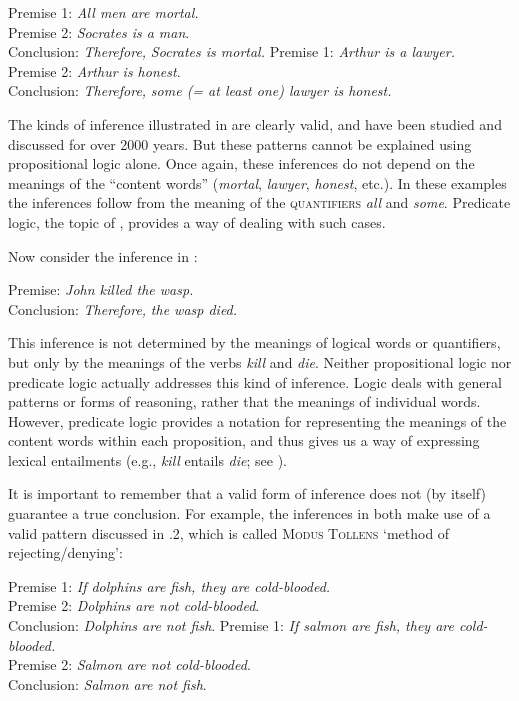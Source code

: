 \ea \label{ex:4.2}
\ea  Premise 1: \textit{All men are mortal.}\\
Premise 2: \textit{Socrates is a man}.\\
\FelixHRule
Conclusion: \textit{Therefore,} \textit{Socrates is mortal.}
\ex Premise 1: \textit{Arthur is a lawyer.}\\
Premise 2: \textit{Arthur is honest}.\\
\FelixHRule
Conclusion: \textit{Therefore,} \textit{some (= at least one) lawyer is honest.}
                       \z
\z


The kinds of inference illustrated in  are clearly valid, and have been studied and discussed for over 2000 years. But these patterns cannot be explained using propositional logic alone. Once again, these inferences do not depend on the meanings of the “content words” (\textit{mortal}, \textit{lawyer}, \textit{honest}, etc.). In these examples the inferences follow from the meaning of the \textsc{quantifiers} \textit{all} and \textit{some}. Predicate logic, the topic of , provides a way of dealing with such cases.



Now consider the inference in :


\ea \label{ex:4.3}
Premise: \textit{John killed the wasp.\\
}\FelixHRule
Conclusion: \textit{Therefore,} \textit{the wasp died.}
\z


This inference is not determined by the meanings of logical words or quantifiers, but only by the meanings of the verbs \textit{kill} and \textit{die}. Neither propositional logic nor predicate logic actually addresses this kind of inference. Logic deals with general patterns or forms of reasoning, rather that the meanings of individual words. However, predicate logic provides a notation for representing the meanings of the content words within each proposition, and thus gives us a way of expressing lexical entailments (e.g., \textit{kill} entails \textit{die}; see ).



It is important to remember that a valid form of inference does not (by itself) guarantee a true conclusion. For example, the inferences in  both make use of a valid pattern discussed in .2, which is called \textsc{Modus Tollens} ‘method of rejecting/denying’:


\ea \label{ex:4.4}
\ea  Premise 1: \textit{If dolphins are fish, they are cold-blooded.}\\
Premise 2: \textit{Dolphins are not cold-blooded}.\\
\FelixHRule
Conclusion: \textit{Dolphins are not fish}.
\ex Premise 1: \textit{If salmon are fish, they are cold-blooded.}\\
Premise 2: \textit{Salmon are not cold-blooded}.\\
\FelixHRule
Conclusion: \textit{Salmon are not fish}.
                       \z
\z


